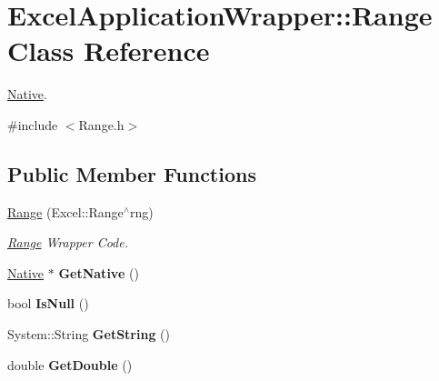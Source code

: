 \hypertarget{class_excel_application_wrapper_1_1_range}{}\section{Excel\+Application\+Wrapper\+:\+:Range Class Reference}
\label{class_excel_application_wrapper_1_1_range}


\hyperlink{class_native}{Native}.  




{\ttfamily \#include $<$Range.\+h$>$}

\subsection*{Public Member Functions}
\begin{DoxyCompactItemize}
\item 
\hypertarget{class_excel_application_wrapper_1_1_range_a2234abd5a398614d505c44c4b43440dd}{}\hyperlink{class_excel_application_wrapper_1_1_range_a2234abd5a398614d505c44c4b43440dd}{Range} (Excel\+::\+Range$^\wedge$rng)\label{class_excel_application_wrapper_1_1_range_a2234abd5a398614d505c44c4b43440dd}

\begin{DoxyCompactList}\small\item\em \hyperlink{class_excel_application_wrapper_1_1_range}{Range} Wrapper Code. \end{DoxyCompactList}\item 
\hypertarget{class_excel_application_wrapper_1_1_range_a39fe0a87438404c22d279d7310602c2f}{}\hyperlink{class_native}{Native} $\ast$ {\bfseries Get\+Native} ()\label{class_excel_application_wrapper_1_1_range_a39fe0a87438404c22d279d7310602c2f}

\item 
\hypertarget{class_excel_application_wrapper_1_1_range_a7d2b2aec21d85db557e75e72dcf18766}{}bool {\bfseries Is\+Null} ()\label{class_excel_application_wrapper_1_1_range_a7d2b2aec21d85db557e75e72dcf18766}

\item 
\hypertarget{class_excel_application_wrapper_1_1_range_aca23a1c2571da1a93e089f7062920296}{}System\+::\+String {\bfseries Get\+String} ()\label{class_excel_application_wrapper_1_1_range_aca23a1c2571da1a93e089f7062920296}

\item 
\hypertarget{class_excel_application_wrapper_1_1_range_a8161c71daf5eedf2536560f76e2f1474}{}double {\bfseries Get\+Double} ()\label{class_excel_application_wrapper_1_1_range_a8161c71daf5eedf2536560f76e2f1474}


\end{DoxyCompactItemize}

